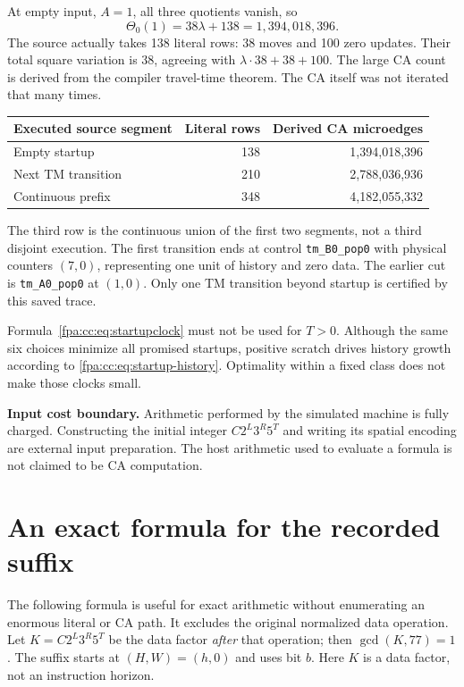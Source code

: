 \documentclass[11pt,a4paper]{article}
\numberwithin{equation}{section}
\newcommand{\code}[1]{\texttt{\small #1}}
\newcommand{\lam}{\lambda}
\begin{document}
At empty input, $A=1$, all three quotients vanish, so
\begin{equation}
 \Theta_0(1)=38\lam+138=1{,}394{,}018{,}396.
 \label{fpa:cc:eq:empty}
\end{equation}
The source actually takes 138 literal rows: 38 moves and 100 zero updates.
Their total square variation is 38, agreeing with
$\lam\cdot38+38+100$. The large CA count is derived from the compiler
travel-time theorem. The CA itself was not iterated that many times.

\begin{center}
\begin{tabular}{@{}lrr@{}}
\toprule
Executed source segment & Literal rows & Derived CA microedges\\
\midrule
Empty startup & 138 & 1,394,018,396\\
Next TM transition & 210 & 2,788,036,936\\
Continuous prefix & 348 & 4,182,055,332\\
\bottomrule
\end{tabular}
\end{center}

The third row is the continuous union of the first two segments, not a
third disjoint execution. The first transition ends at control
\code{tm\_B0\_pop0} with physical counters $(7,0)$, representing one unit
of history and zero data. The earlier cut is \code{tm\_A0\_pop0} at $(1,0)$.
Only one TM transition beyond startup is certified by this saved trace.

Formula~\eqref{fpa:cc:eq:startupclock} must not be used for $T>0$. Although the
same six choices minimize all promised startups, positive scratch drives
history growth according to \eqref{fpa:cc:eq:startup-history}. Optimality within
a fixed class does not make those clocks small.

\textbf{Input cost boundary.} Arithmetic performed by the simulated
machine is fully charged. Constructing the initial integer $C2^L3^R5^T$
and writing its spatial encoding are external input preparation. The host
arithmetic used to evaluate a formula is not claimed to be CA computation.
\newpage

\section{An exact formula for the recorded suffix}
\label{fpa:cc:sec:suffix}
The following formula is useful for exact arithmetic without enumerating
an enormous literal or CA path. It excludes the original normalized data
operation. Let $K=C2^L3^R5^T$ be the data factor \emph{after} that operation;
then $\gcd(K,77)=1$. The suffix starts at $(H,W)=(h,0)$ and uses bit $b$.
Here $K$ is a data factor, not an instruction horizon.
\end{document}
